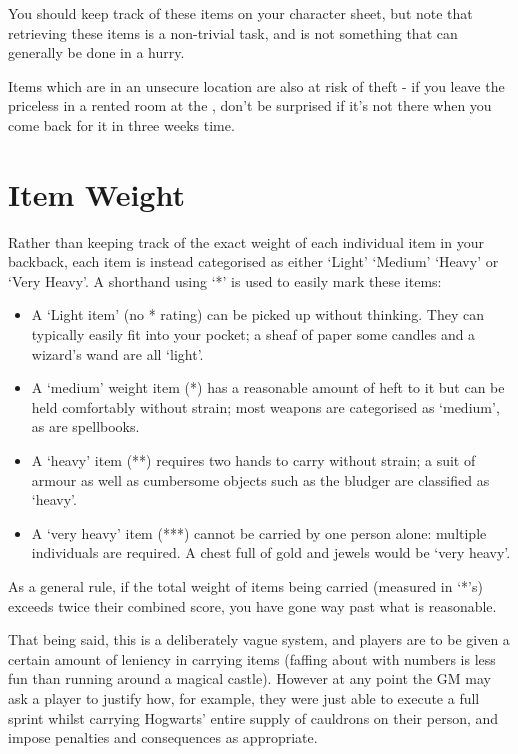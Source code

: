 You should keep track of these items on your character sheet, but note that retrieving these items is a non-trivial task, and is not something that can generally be done in a hurry. 

Items which are  in an unsecure location are also at risk of theft - if you leave the priceless  in a rented room at the , don't be surprised if it's not there when you come back for it in three weeks time. 



\section{Item Weight}

Rather than keeping track of the exact weight of each individual item in your backback\comma{}, each item is instead categorised as either `Light'\comma{} `Medium'\comma{} `Heavy' or `Very Heavy'. A shorthand using `*' is used to easily mark these items:
\begin{itemize}[itemsep = 0pt]
\item A `Light item' (no * rating) can be picked up without thinking. They can typically easily fit into your pocket; a sheaf of paper\comma{} some candles and a wizard's wand are all `light'. 

\item A `medium' weight item (*) has a reasonable amount of heft to it\comma{} but can be held comfortably without strain; most weapons are categorised as `medium', as are spellbooks.

\item A `heavy' item (**) requires two hands to carry without strain; a suit of armour\comma{} as well as cumbersome objects such as the bludger are classified as `heavy'.

\item A `very heavy' item (***) cannot be carried by one person alone: multiple individuals are required. A chest full of gold and jewels would be `very heavy'. 
\end{itemize}
As a general rule, if the total weight of items being carried (measured in `*'s) exceeds twice their combined  score, you have gone way past what is reasonable.  

That being said, this is a deliberately vague system, and players are to be given a certain amount of leniency in carrying items (faffing about with numbers is less fun than running around a magical castle). However at any point the GM may ask a player to justify how, for example, they were just able to execute a full sprint whilst carrying Hogwarts' entire supply of cauldrons on their person, and impose penalties and consequences as appropriate. 






